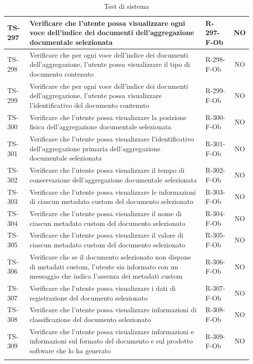 \documentclass[a4paper,12pt]{article}
\begin{document}
\begin{longtable}{|p{1.5cm}|p{8.3cm}|p{2.4cm}|c|}
\hline
TS-297 & Verificare che l'utente possa visualizzare ogni voce dell'indice dei documenti dell'aggregazione documentale selezionata & R-297-F-Ob & NO \\
\hline
TS-298 & Verificare che per ogni voce dell'indice dei documenti dell'aggregazione, l'utente possa visualizzare il tipo di documento contenuto & R-298-F-Ob & NO \\
\hline
TS-299 & Verificare che per ogni voce dell'indice dei documenti dell'aggregazione, l'utente possa visualizzare l'identificativo del documento contenuto & R-299-F-Ob & NO \\
\hline
TS-300 & Verificare che l'utente possa visualizzare la posizione fisica dell'aggregazione documentale selezionata & R-300-F-Ob & NO \\
\hline
TS-301 & Verificare che l'utente possa visualizzare l'identificativo dell'aggregazione primaria dell'aggregazione documentale selezionata & R-301-F-Ob & NO \\
\hline
TS-302 & Verificare che l'utente possa visualizzare il tempo di conservazione dell'aggregazione documentale selezionata & R-302-F-Ob & NO \\
\hline
TS-303 & Verificare che l'utente possa visualizzare le informazioni di ciascun metadato custom del documento selezionato & R-303-F-Ob & NO \\
\hline
TS-304 & Verificare che l'utente possa visualizzare il nome di ciascun metadato custom del documento selezionato & R-304-F-Ob & NO \\
\hline
TS-305 & Verificare che l'utente possa visualizzare il valore di ciascun metadato custom del documento selezionato & R-305-F-Ob & NO \\
\hline
TS-306 & Verificare che se il documento selezionato non dispone di metadati custom, l'utente sia informato con un messaggio che indica l'assenza dei metadati custom & R-306-F-Ob & NO \\
\hline
TS-307 & Verificare che l'utente possa visualizzare i dati di registrazione del documento selezionato & R-307-F-Ob & NO \\
\hline
TS-308 & Verificare che l'utente possa visualizzare informazioni di classificazione del documento selezionato & R-308-F-Ob & NO \\
\hline
TS-309 & Verificare che l'utente possa visualizzare informazioni e informazioni sul formato del documento e sul prodotto software che lo ha generato & R-309-F-Ob & NO \\
\hline
\rowcolor{white}
\caption{Test di sistema}
\label{tab:test-sistema}
\end{longtable}
\end{document}
